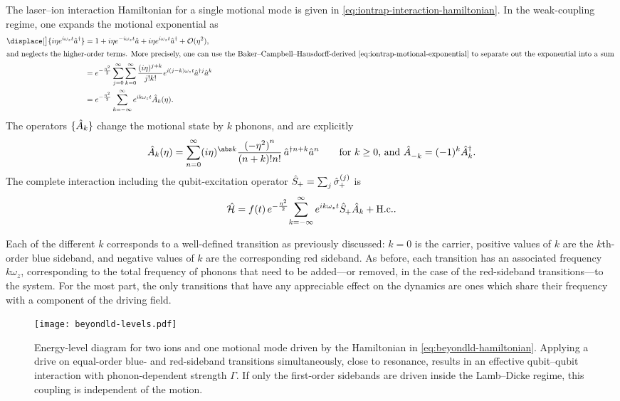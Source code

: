 The laser--ion interaction Hamiltonian for a single motional mode is given in \cref{eq:iontrap-interaction-hamiltonian}.
In the weak-coupling regime, one expands the motional exponential as
\begin{align}
\displace[\big]{i\eta e^{i\omega_zt}\a^\dagger} &= 1 + i\eta e^{-i\omega_z t}\a + i\eta e^{i\omega_z t}\a^\dagger + \order{\eta^2},\\
\intertext{%
and neglects the higher-order terms.
More precisely, one can use the Baker--Campbell--Hausdorff-derived \cref{eq:iontrap-motional-exponential} to separate out the exponential into a sum
}
&\begin{aligned}
    &= e^{-\frac{\eta^2}2} \sum_{j=0}^\infty\sum_{k=0}^\infty \frac{(i\eta)^{j+k}}{j!k!}e^{i(j-k)\omega_z t}\a^{\dagger j}\a^k\\
    &= e^{-\frac{\eta^2}2} \sum_{k=-\infty}^\infty e^{ik\omega_z t} \op A_k(\eta).
\end{aligned}\end{align}
The operators $\{\hat{A}_k\}$ change the motional state by $k$ phonons, and are explicitly
\begin{equation}\label{eq:beyondld-fourier-operators}
\op A_k(\eta) = \sum_{n=0}^\infty (i\eta)^{\abs k}\frac{{(-\eta^2)}^n}{(n+k)!n!}\,\a^{\dagger n+k}\a^n  \qquad\text{for $k \ge 0$, and $\op A_{-k}^{\vphantom\dagger} = (-1)^k\op A_k^\dagger$.}
\end{equation}
The complete interaction including the qubit-excitation operator $\hat{S}_{\mkern-1mu+} = \sum_j\hat{\sigma}_{\mkern-1mu+}^{(j)}$ is
\begin{equation}\label{eq:beyondld-general-hamiltonian}
\hat{\mathcal H} = f(t)\,e^{-\frac{\eta^2}2}\!\sum_{k=-\infty}^\infty e^{ik\omega_z t} \hat{S}_{\mkern-1mu+}\hat{A}_k + \text{H.c.}.
\end{equation}

Each of the different $k$ corresponds to a well-defined transition as previously discussed: $k=0$ is the carrier, positive values of $k$ are the $k$th-order blue sideband, and negative values of $k$ are the corresponding red sideband.
As before, each transition has an associated frequency $k\omega_z$, corresponding to the total frequency of phonons that need to be added---or removed, in the case of the red-sideband transitions---to the system.
For the most part, the only transitions that have any appreciable effect on the dynamics are ones which share their frequency with a component of the driving field.

\begin{figure}
    \texttt{[image: beyondld-levels.pdf]}
    \caption[Energy-level diagram of two co-trapped ions with motion]{\label{fig:beyondld-levels}%
        Energy-level diagram for two ions and one motional mode driven by the Hamiltonian in \cref{eq:beyondld-hamiltonian}.
        Applying a drive on equal-order blue- and red-sideband transitions simultaneously, close to resonance, results in an effective qubit--qubit interaction with phonon-dependent strength $\Gamma$.
        If only the first-order sidebands are driven inside the Lamb--Dicke regime, this coupling is independent of the motion.
    }
\end{figure}

